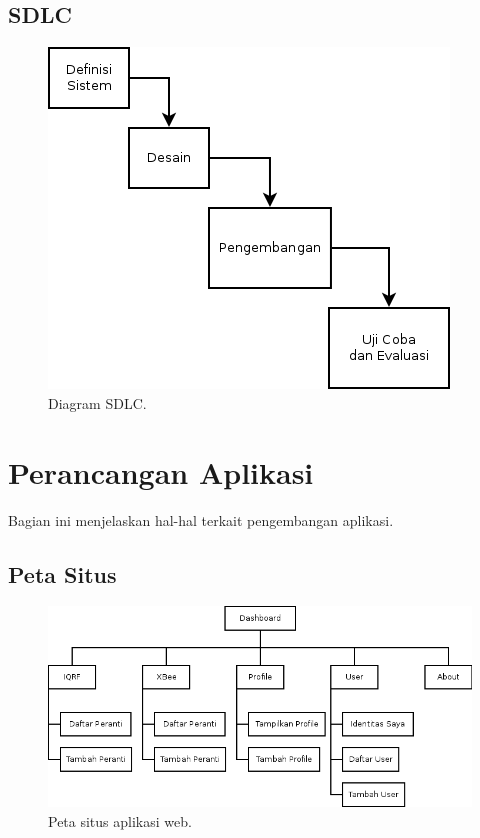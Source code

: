 		\subsection{SDLC}
			\begin{figure}[ht!]
			  \centering
			    \includegraphics{gambar/sdlc}
			    \caption{Diagram SDLC.}
			    \label{sdlc}
			\end{figure}
	
	\section{Perancangan Aplikasi}
		Bagian ini menjelaskan hal-hal terkait pengembangan aplikasi.

		\subsection{Peta Situs}
			\begin{figure}[ht!]
			  \centering
			    \includegraphics{gambar/sitemap}
			    \caption{Peta situs aplikasi web.}
			    \label{sitemap}
			\end{figure}

